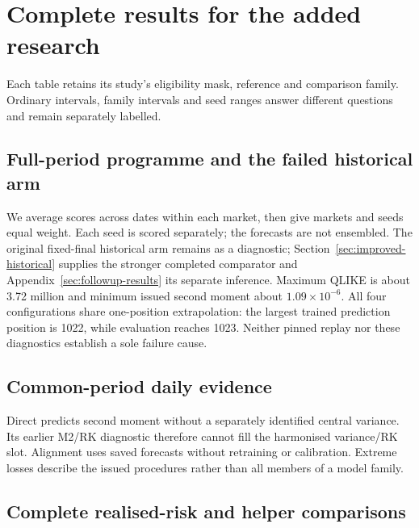 \section{Complete results for the added research}
\label{sec:new-research-results}

Each table retains its study's eligibility mask, reference and comparison family. Ordinary intervals, family intervals and seed ranges answer different questions and remain separately labelled.

\subsection{Full-period programme and the failed historical arm}





We average scores across dates within each market, then give markets and seeds equal weight. Each seed is scored separately; the forecasts are not ensembled. The original fixed-final historical arm remains as a diagnostic; Section~\ref{sec:improved-historical} supplies the stronger completed comparator and Appendix~\ref{sec:followup-results} its separate inference. Maximum QLIKE is about 3.72 million and minimum issued second moment about $1.09\times10^{-6}$. All four configurations share one-position extrapolation: the largest trained prediction position is 1022, while evaluation reaches 1023. Neither pinned replay nor these diagnostics establish a sole failure cause.

\subsection{Common-period daily evidence}




Direct predicts second moment without a separately identified central variance. Its earlier M2/RK diagnostic therefore cannot fill the harmonised variance/RK slot. Alignment uses saved forecasts without retraining or calibration. Extreme losses describe the issued procedures rather than all members of a model family.

\subsection{Complete realised-risk and helper comparisons}

